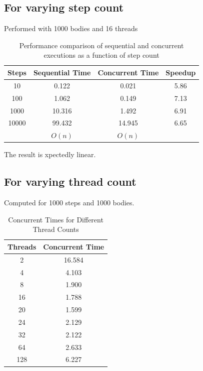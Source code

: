 \documentclass{article}
\begin{document}
\subsection{For varying step count}
Performed with 1000 bodies and 16 threads
\begin{table}[h]
  \centering
  \begin{tabular}{|c|c|c|c|}
    \hline
    Steps & Sequential Time & Concurrent Time & Speedup \\ \hline
    10 & 0.122 & 0.021 & 5.86 \\ \hline
    100 & 1.062 & 0.149 & 7.13 \\ \hline
    1000 & 10.316 & 1.492 & 6.91 \\ \hline
    10000 & 99.432 & 14.945 & 6.65 \\ \hline
    & $O(n)$ & $O(n)$ & \\ \hline
  \end{tabular}
  \caption{Performance comparison of sequential and concurrent executions as a function of step count}
  \label{tab:performance_comparison}
\end{table}

		
The result is xpectedly linear.			

\subsection{For varying thread count}
Computed for 1000 steps and 1000 bodies.



\begin{table}[h]
  \centering
  \begin{tabular}{|c|c|}
    \hline
    Threads & Concurrent Time \\ \hline
    2  & 16.584 \\ \hline
    4  & 4.103 \\ \hline
    8  & 1.900 \\ \hline
    16 & 1.788 \\ \hline
    20 & 1.599 \\ \hline
    24 & 2.129 \\ \hline
    32 & 2.122 \\ \hline
    64 & 2.633 \\ \hline
    128 & 6.227 \\ \hline
  \end{tabular}
  \caption{Concurrent Times for Different Thread Counts}
  \label{tab:concurrent_times}
\end{table}
	
\end{document}
